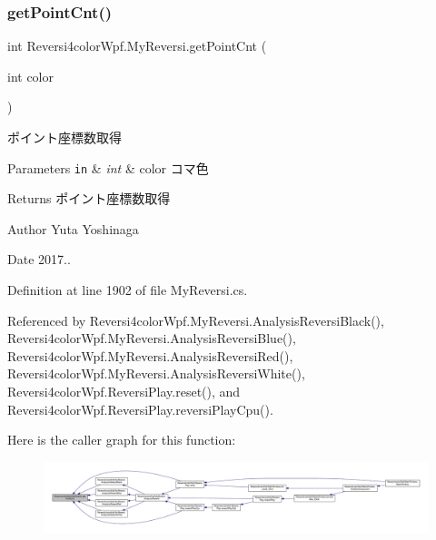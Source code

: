 \subsubsection{\texorpdfstring{get\+Point\+Cnt()}{getPointCnt()}}
{\footnotesize\ttfamily int Reversi4color\+Wpf.\+My\+Reversi.\+get\+Point\+Cnt (\begin{DoxyParamCaption}\item[{int}]{color }\end{DoxyParamCaption})}



ポイント座標数取得 


\begin{DoxyParams}[1]{Parameters}
\mbox{\tt in}  & {\em int} & color コマ色 \\
\hline
\end{DoxyParams}
\begin{DoxyReturn}{Returns}
ポイント座標数取得 
\end{DoxyReturn}
\begin{DoxyAuthor}{Author}
Yuta Yoshinaga 
\end{DoxyAuthor}
\begin{DoxyDate}{Date}
2017.. 
\end{DoxyDate}


Definition at line 1902 of file My\+Reversi.\+cs.



Referenced by Reversi4color\+Wpf.\+My\+Reversi.\+Analysis\+Reversi\+Black(), Reversi4color\+Wpf.\+My\+Reversi.\+Analysis\+Reversi\+Blue(), Reversi4color\+Wpf.\+My\+Reversi.\+Analysis\+Reversi\+Red(), Reversi4color\+Wpf.\+My\+Reversi.\+Analysis\+Reversi\+White(), Reversi4color\+Wpf.\+Reversi\+Play.\+reset(), and Reversi4color\+Wpf.\+Reversi\+Play.\+reversi\+Play\+Cpu().

Here is the caller graph for this function\+:
\nopagebreak
\begin{figure}[H]
\begin{center}
\leavevmode
\includegraphics[width=350pt]{class_reversi4color_wpf_1_1_my_reversi_ac9f2dfa1075b49a69fa87ab4a45ae5f8_icgraph}
\end{center}
\end{figure}
\mbox{\label{class_reversi4color_wpf_1_1_my_reversi_aacb2634fe75f3290910033d13bd335aa}} 
